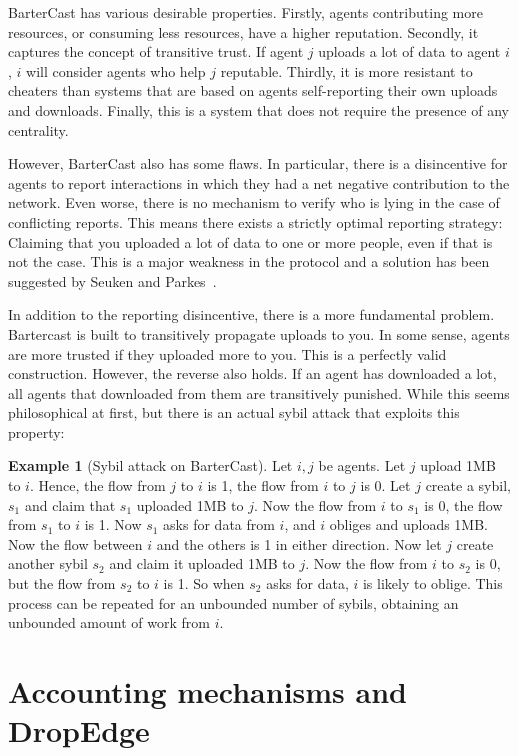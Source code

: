 \documentclass[a4paper,11pt]{book}
\theoremstyle{definition}
\newtheorem*{example}{Example}
\begin{document}
BarterCast has various desirable properties. Firstly, agents contributing more resources, or consuming
less resources, have a higher reputation. Secondly, it captures the concept of transitive trust. If agent
$j$ uploads a lot of data to agent $i$, $i$ will consider agents who help $j$ reputable. Thirdly,
it is more resistant to cheaters than systems that are based on agents self-reporting their own uploads and
downloads. Finally, this is a system that does not require the presence of any centrality. 

However, BarterCast also has some flaws. In particular, there is a disincentive for agents to report
interactions in which they had a net negative contribution to the network. Even worse, there is no mechanism
to verify who is lying in the case of conflicting reports. This means there exists a strictly optimal 
reporting strategy: Claiming that you uploaded a lot of data to one or more people, even if that is not
the case. This is a major weakness in the protocol and a solution has been suggested by Seuken and 
Parkes~\cite{seuken2010accounting}. 

In addition to the reporting disincentive, there is a more fundamental problem. Bartercast is built
to transitively propagate uploads to you. In some sense, agents are more trusted if they uploaded
more to you. This is a perfectly valid construction. However, the reverse also holds. If an agent
has downloaded a lot, all agents that downloaded from them are transitively punished. While
this seems philosophical at first, but there is an actual sybil
attack that exploits this property:

\begin{example}[Sybil attack on BarterCast]
     Let $i, j$ be agents. Let $j$ upload 1MB to $i$. Hence, the flow from $j$ to $i$ is 1, the flow
    from $i$ to $j$ is 0. Let $j$ create a sybil, $s_1$ and claim that $s_1$ uploaded 1MB to $j$.
    Now the flow from $i$ to $s_1$ is $0$, the flow from $s_1$ to $i$ is 1. Now $s_1$ asks
    for data from $i$, and $i$ obliges and uploads 1MB. Now the flow between $i$ and the others is
    1 in either direction. Now let $j$ create another sybil $s_2$ and claim it uploaded 1MB to $j$. 
    Now the flow from $i$ to $s_2$ is 0, but the flow from $s_2$ to $i$ is 1. 
    So when $s_2$ asks for data, $i$ is likely to oblige. This process can be repeated for an unbounded
    number of sybils, obtaining an unbounded amount of work from $i$.
\end{example}

\section{Accounting mechanisms and DropEdge}
\end{document}
